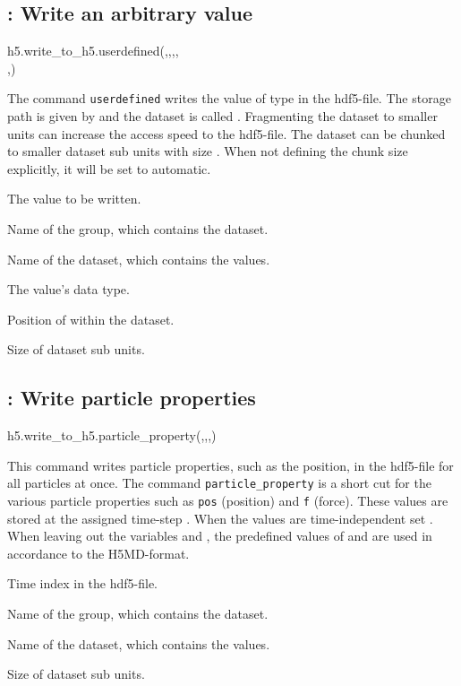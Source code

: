 \subsection{: Write an arbitrary value}
\begin{pyessyntax}
h5.write_to_h5.userdefined(,,,,\\,)
\end{pyessyntax}
The command \texttt{userdefined} writes the value  of type  in the hdf5-file. The storage path is given by  and the dataset is called . Fragmenting the dataset to smaller units can increase the access speed to the hdf5-file. The dataset can be chunked to smaller dataset sub units with size . When not defining the chunk size explicitly, it will be set to automatic.
\begin{arguments}
\item[\var{value}] The value to be written.
\item[\var{groupname}] Name of the group, which contains the dataset.
\item[\var{datasetname}] Name of the dataset, which contains the values.
\item[\var{datatype}] The value's data type.
\item[\var{datasetindex}] Position of  within the dataset.
\item[\var{chunks}] Size of dataset sub units. 
\end{arguments}

\subsection{: Write particle properties}
\begin{pyessyntax}
h5.write_to_h5.particle_property(,,,)
\end{pyessyntax}
This command writes particle properties, such as the position, in the hdf5-file for all particles at once. The command \mbox{\texttt{particle_property}} is a short cut for the various particle properties such as \texttt{pos} (position) and \texttt{f} (force). These values are stored at the assigned time-step . When the values are time-independent set . When leaving out the variables  and , the predefined values of  and  are used in accordance to the H5MD-format.
\begin{arguments}
\item[\var{timestep}] Time index in the hdf5-file.
\item[\var{groupname}] Name of the group, which contains the dataset.
\item[\var{datasetname}] Name of the dataset, which contains the values.
\item[\var{chunks}] Size of dataset sub units. 
\end{arguments}

